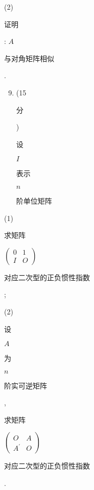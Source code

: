 \documentclass[10pt]{article}
\begin{document}
(2) \begin{CJK}{UTF8}{mj}证明\end{CJK}: $A$ \begin{CJK}{UTF8}{mj}与对角矩阵相似\end{CJK}.

\begin{enumerate}
  \setcounter{enumi}{8}
  \item (15 \begin{CJK}{UTF8}{mj}分\end{CJK}) \begin{CJK}{UTF8}{mj}设\end{CJK} $I$ \begin{CJK}{UTF8}{mj}表示\end{CJK} $n$ \begin{CJK}{UTF8}{mj}阶单位矩阵\end{CJK}
\end{enumerate}
(1) \begin{CJK}{UTF8}{mj}求矩阵\end{CJK} $\left(\begin{array}{ll}0 & 1 \\ I & O\end{array}\right)$ \begin{CJK}{UTF8}{mj}对应二次型的正负惯性指数\end{CJK};

(2) \begin{CJK}{UTF8}{mj}设\end{CJK} $A$ \begin{CJK}{UTF8}{mj}为\end{CJK} $n$ \begin{CJK}{UTF8}{mj}阶实可逆矩阵\end{CJK}, \begin{CJK}{UTF8}{mj}求矩阵\end{CJK} $\left(\begin{array}{cc}O & A \\ A^{\prime} & O\end{array}\right)$ \begin{CJK}{UTF8}{mj}对应二次型的正负惯性指数\end{CJK}.
\end{document}
